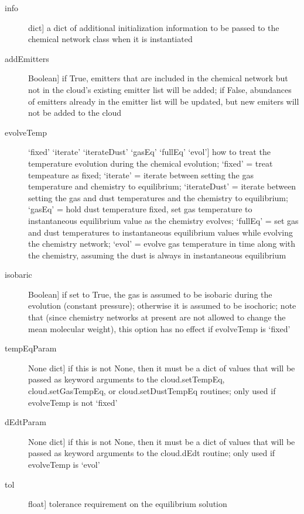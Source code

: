 \documentclass[letterpaper,10pt,english]{sphinxmanual}
\begin{document}
\begin{fulllineitems}
\begin{fulllineitems}
\begin{description}
\begin{description}
\item[{info}] \leavevmode{[}dict{]}
a dict of additional initialization information to be passed
to the chemical network class when it is instantiated

\item[{addEmitters}] \leavevmode{[}Boolean{]}
if True, emitters that are included in the chemical
network but not in the cloud's existing emitter list will
be added; if False, abundances of emitters already in the
emitter list will be updated, but new emiters will not be
added to the cloud

\item[{evolveTemp}] \leavevmode{[}`fixed' \textbar{} `iterate' \textbar{} `iterateDust' \textbar{} `gasEq' \textbar{} `fullEq' \textbar{} `evol'{]}
how to treat the temperature evolution during the chemical
evolution; `fixed' = treat tempeature as fixed; `iterate' =
iterate between setting the gas temperature and chemistry to
equilibrium; `iterateDust' = iterate between setting the gas
and dust temperatures and the chemistry to equilibrium;
`gasEq' = hold dust temperature fixed, set gas temperature to
instantaneous equilibrium value as the chemistry evolves;
`fullEq' = set gas and dust temperatures to instantaneous
equilibrium values while evolving the chemistry network;
`evol' = evolve gas temperature in time along with the
chemistry, assuming the dust is always in instantaneous
equilibrium

\item[{isobaric}] \leavevmode{[}Boolean{]}
if set to True, the gas is assumed to be isobaric during
the evolution (constant pressure); otherwise it is assumed
to be isochoric; note that (since chemistry networks at
present are not allowed to change the mean molecular
weight), this option has no effect if evolveTemp is `fixed'

\item[{tempEqParam}] \leavevmode{[}None \textbar{} dict{]}
if this is not None, then it must be a dict of values that
will be passed as keyword arguments to the cloud.setTempEq,
cloud.setGasTempEq, or cloud.setDustTempEq routines; only
used if evolveTemp is not `fixed'

\item[{dEdtParam}] \leavevmode{[}None \textbar{} dict{]}
if this is not None, then it must be a dict of values that
will be passed as keyword arguments to the cloud.dEdt
routine; only used if evolveTemp is `evol'

\item[{tol}] \leavevmode{[}float{]}
tolerance requirement on the equilibrium solution


\end{description}
\end{description}
\end{fulllineitems}
\end{fulllineitems}
\end{document}
